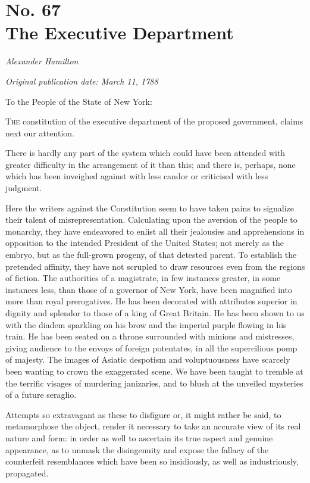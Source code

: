 \chapter[No. 67: The Executive Department]{No. 67\\ {\small The Executive Department}}

\textit{Alexander Hamilton}

\textit{Original publication date: March 11, 1788}
\vspace{1cm}

To the People of the State of New York:
\vspace{.4cm}

\textsc{The} constitution of the executive department of the proposed government, claims next our attention.

There is hardly any part of the system which could have been attended with greater difficulty in the arrangement of it than this; and there is, perhaps, none which has been inveighed against with less candor or criticised with less judgment.

Here the writers against the Constitution seem to have taken pains to signalize their talent of misrepresentation. 
Calculating upon the aversion of the people to monarchy, they have endeavored to enlist all their jealousies and apprehensions in opposition to the intended President of the United States; not merely as the embryo, but as the full-grown progeny, of that detested parent. 
To establish the pretended affinity, they have not scrupled to draw resources even from the regions of fiction. 
The authorities of a magistrate, in few instances greater, in some instances less, than those of a governor of New York, have been magnified into more than royal prerogatives. 
He has been decorated with attributes superior in dignity and splendor to those of a king of Great Britain. 
He has been shown to us with the diadem sparkling on his brow and the imperial purple flowing in his train. 
He has been seated on a throne surrounded with minions and mistresses, giving audience to the envoys of foreign potentates, in all the supercilious pomp of majesty. 
The images of Asiatic despotism and voluptuousness have scarcely been wanting to crown the exaggerated scene. 
We have been taught to tremble at the terrific visages of murdering janizaries, and to blush at the unveiled mysteries of a future seraglio.

Attempts so extravagant as these to disfigure or, it might rather be said, to metamorphose the object, render it necessary to take an accurate view of its real nature and form: in order as well to ascertain its true aspect and genuine appearance, as to unmask the disingenuity and expose the fallacy of the counterfeit resemblances which have been so insidiously, as well as industriously, propagated.

